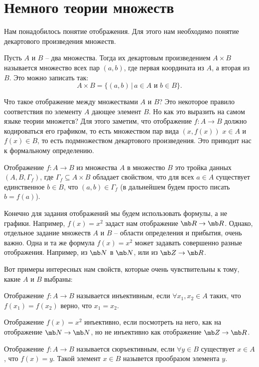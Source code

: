 \section{Немного теории множеств}

Нам понадобилось понятие отображения. Для этого нам необходимо понятие декартового произведения множеств.

\dfn Пусть $A$ и $B$ -- два множества. Тогда их декартовым произведением $A\times B$ называется множество всех пар $(a,b)$, где первая координата из $A$, а вторая из $B$. Это можно записать так:
$$ A \times B = \{ (a,b) \, | \, a \in A \text{ и } b \in B \}.$$
\edfn

Что такое отображение между множествами $A$  и $B$? Это некоторое правило соответствия по элементу $A$ дающее элемент $B$. Но как это выразить на самом языке теории множетсв? Для этого заметим, что отображение $f\colon A \to B$ должно кодироваться его графиком, то есть множеством пар вида $(x,f(x))$ $x\in A$ и $f(x)\in B$, то есть подмножеством декартового произведения. Это приводит нас к формальному определению.


\dfn Отображение $f \colon A \to B$ из множества $A$ в множество $B$ это тройка данных $(A,B,\Gamma_f)$, где $\Gamma_f \subseteq A \times B$ обладает свойством, что для всех $a \in A$ существует единственное $b \in B$, что $(a,b) \in \Gamma_f$ (в дальнейшем будем просто писать $b=f(a)$). 
\edfn

Конечно для задания отображений мы будем использовать формулы, а не графики. Например, $f(x)=x^2$ задаст нам отображение $\mb R \to \mb R$. Однако, отдельное задание множеств $A$ и $B$ -- области определения и прибытия, очень важно. Одна и та же формула $f(x)=x^2$ может задавать совершенно разные отображения. Например, из $\mb N$ в $\mb N$, или из $\mb Z \to \mb R$.

Вот примеры интересных нам свойств, которые очень чувствительны к тому, какие $A$ и $B$ выбраны:

\dfn Отображение $f \colon A \to B$ называется инъективным, если $\forall x_1,x_2 \in A$ таких, что $f(x_1)=f(x_2)$ верно, что $x_1=x_2$.
\edfn

Отображение $f(x)=x^2$ инъективно, если посмотреть на него, как на отображение $\mb N \to \mb N$, но не инъективно как отображение $\mb Z \to \mb R$.

\dfn Отображение $f \colon A \to B$ называется сюръективным, если $\forall y\in B$ существует $x \in A$, что $f(x)=y$. Такой элемент $x\in B$ назывется прообразом элемента $y$.
\edfn

